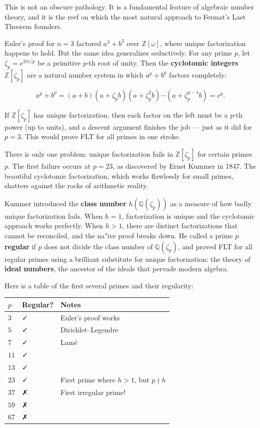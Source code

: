This is not an obscure pathology. It is a fundamental feature of algebraic number theory, and it is the reef on which the most natural approach to Fermat's Last Theorem founders.

Euler's proof for \(n = 3\) factored \(a^3 + b^3\) over \(\mathbb{Z}[\omega]\), where unique factorization happens to hold. But the same idea generalizes seductively. For any prime \(p\), let \(\zeta_p = e^{2\pi i/p}\) be a primitive \(p\)-th root of unity. Then the \textbf{cyclotomic integers} \(\mathbb{Z}[\zeta_p]\) are a natural number system in which \(a^p + b^p\) factors completely:

\[a^p + b^p = (a + b)(a + \zeta_p b)(a + \zeta_p^2 b) \cdots (a + \zeta_p^{p-1} b) = c^p.\]

If \(\mathbb{Z}[\zeta_p]\) has unique factorization, then each factor on the left must be a \(p\)-th power (up to units), and a descent argument finishes the job --- just as it did for \(p = 3\). This would prove FLT for all primes in one stroke.

There is only one problem: unique factorization fails in \(\mathbb{Z}[\zeta_p]\) for certain primes \(p\). The first failure occurs at \(p = 23\), as discovered by Ernst Kummer in 1847. The beautiful cyclotomic factorization, which works flawlessly for small primes, shatters against the rocks of arithmetic reality.

Kummer introduced the \textbf{class number} \(h(\mathbb{Q}(\zeta_p))\) as a measure of how badly unique factorization fails. When \(h = 1\), factorization is unique and the cyclotomic approach works perfectly. When \(h > 1\), there are distinct factorizations that cannot be reconciled, and the na"ive proof breaks down. He called a prime \(p\) \textbf{regular} if \(p\) does not divide the class number of \(\mathbb{Q}(\zeta_p)\), and proved FLT for all regular primes using a brilliant substitute for unique factorization: the theory of \textbf{ideal numbers}, the ancestor of the ideals that pervade modern algebra.

Here is a table of the first several primes and their regularity:

\begin{longtable}[]{@{}lll@{}}
\toprule\noalign{}
\(p\) & Regular? & Notes \\
\midrule\noalign{}
\endhead
\bottomrule\noalign{}
\endlastfoot
\(3\) & ✓ & Euler's proof works \\
\(5\) & ✓ & Dirichlet--Legendre \\
\(7\) & ✓ & Lamé \\
\(11\) & ✓ & \\
\(13\) & ✓ & \\
\(23\) & ✓ & First prime where \(h > 1\), but \(p \nmid h\) \\
\(37\) & ✗ & First irregular prime! \\
\(59\) & ✗ & \\
\(67\) & ✗ & \\
\end{longtable}

